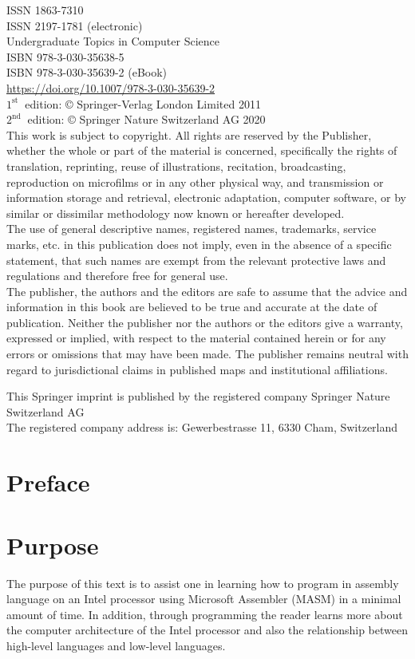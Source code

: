 \documentclass[10pt]{book}
\begin{document}
ISSN 1863-7310\\
ISSN 2197-1781 (electronic)\\
Undergraduate Topics in Computer Science\\
ISBN 978-3-030-35638-5\\
ISBN 978-3-030-35639-2 (eBook)\\
\href{https://doi.org/10.1007/978-3-030-35639-2}{https://doi.org/10.1007/978-3-030-35639-2}\\
$1^{\text {st }}$ edition: © Springer-Verlag London Limited 2011\\
$2^{\text {nd }}$ edition: © Springer Nature Switzerland AG 2020\\
This work is subject to copyright. All rights are reserved by the Publisher, whether the whole or part of the material is concerned, specifically the rights of translation, reprinting, reuse of illustrations, recitation, broadcasting, reproduction on microfilms or in any other physical way, and transmission or information storage and retrieval, electronic adaptation, computer software, or by similar or dissimilar methodology now known or hereafter developed.\\
The use of general descriptive names, registered names, trademarks, service marks, etc. in this publication does not imply, even in the absence of a specific statement, that such names are exempt from the relevant protective laws and regulations and therefore free for general use.\\
The publisher, the authors and the editors are safe to assume that the advice and information in this book are believed to be true and accurate at the date of publication. Neither the publisher nor the authors or the editors give a warranty, expressed or implied, with respect to the material contained herein or for any errors or omissions that may have been made. The publisher remains neutral with regard to jurisdictional claims in published maps and institutional affiliations.

This Springer imprint is published by the registered company Springer Nature Switzerland AG\\
The registered company address is: Gewerbestrasse 11, 6330 Cham, Switzerland


\section*{Preface}
\section*{Purpose}
The purpose of this text is to assist one in learning how to program in assembly language on an Intel processor using Microsoft Assembler (MASM) in a minimal amount of time. In addition, through programming the reader learns more about the computer architecture of the Intel processor and also the relationship between high-level languages and low-level languages.
\end{document}
